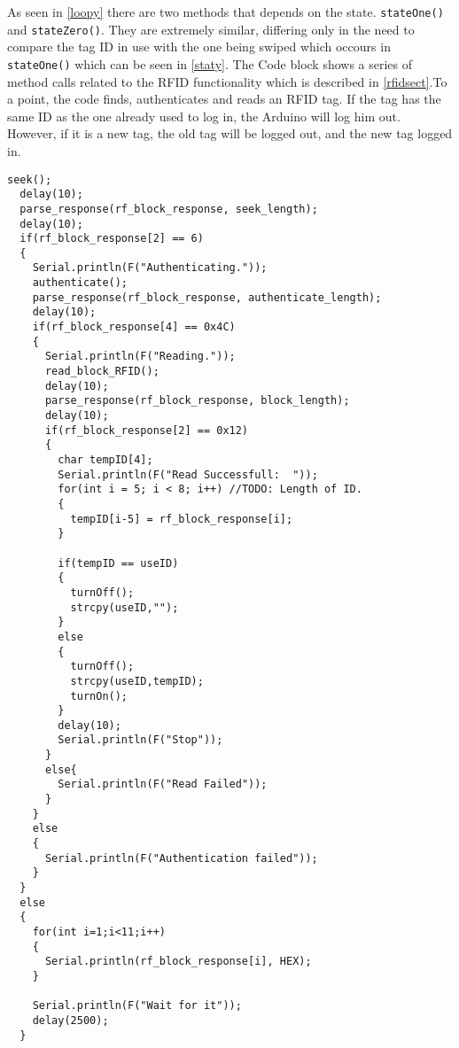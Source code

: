 As seen in \autoref{loopy} there are two methods that depends on the state. \verb|stateOne()| and \verb|stateZero()|. They are extremely similar, differing only in the need to compare the tag ID in use with the one being swiped which occours in \verb|stateOne()| which can be seen in \autoref{staty}. The Code block shows a series of method calls related to the RFID functionality which is described in \autoref{rfidsect}.\newline To a point, the code finds, authenticates and reads an RFID tag. If the tag has the same ID as the one already used to log in, the Arduino will log him out. However, if it is a new tag, the old tag will be logged out, and the new tag logged in.
\begin{lstlisting}[frame=single, label=staty, caption=The Arduino state one code.]
  seek();
  delay(10);
  parse_response(rf_block_response, seek_length);
  delay(10);
  if(rf_block_response[2] == 6)
  {
    Serial.println(F("Authenticating."));
    authenticate();
    parse_response(rf_block_response, authenticate_length);
    delay(10);
    if(rf_block_response[4] == 0x4C)
    {
      Serial.println(F("Reading."));
      read_block_RFID();
      delay(10);
      parse_response(rf_block_response, block_length);
      delay(10);
      if(rf_block_response[2] == 0x12)
      {
        char tempID[4];
        Serial.println(F("Read Successfull:  "));
        for(int i = 5; i < 8; i++) //TODO: Length of ID.
        {        
          tempID[i-5] = rf_block_response[i];
        } 
        
        if(tempID == useID)
        {
          turnOff();
          strcpy(useID,"");
        }
        else
        {
          turnOff();
          strcpy(useID,tempID);
          turnOn();
        }
        delay(10);
        Serial.println(F("Stop"));
      }
      else{
        Serial.println(F("Read Failed"));
      }
    }
    else
    {
      Serial.println(F("Authentication failed"));
    }
  }
  else
  {
    for(int i=1;i<11;i++)
    {
      Serial.println(rf_block_response[i], HEX);
    }
    
    Serial.println(F("Wait for it"));  
    delay(2500);
  }
\end{lstlisting}